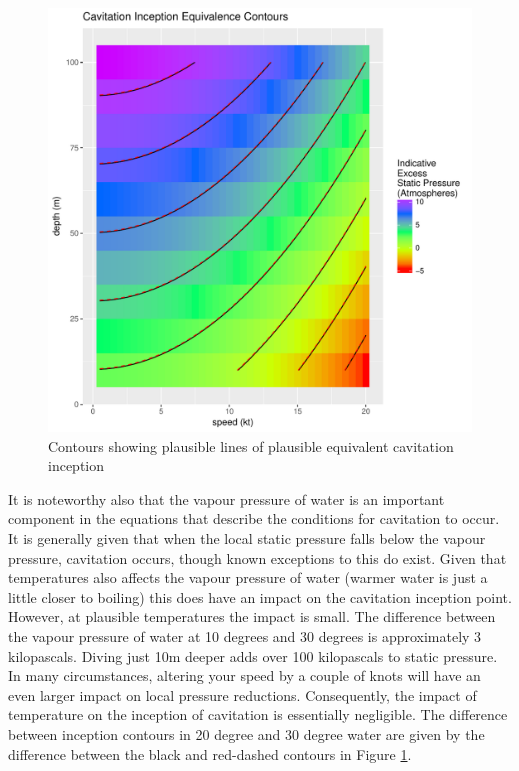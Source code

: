 \documentclass{article}\usepackage[]{graphicx}\usepackage[]{color}
\makeatletter
\def\maxwidth{ %
  \ifdim\Gin@nat@width>\linewidth
    \linewidth
  \else
    \Gin@nat@width
  \fi
}
\newenvironment{knitrout}{}{} %
\makeatother
\begin{document}
\begin{figure}
\begin{knitrout}
\color{fgcolor}

{\centering \includegraphics[width=\maxwidth]{figures/plots-plot_inception-1} 

}



\end{knitrout}
\caption{Contours showing plausible lines of plausible equivalent cavitation inception}
\label{fig:InceptionContours}
\end{figure}

It is noteworthy also that the vapour pressure of water is an important component in the equations that describe the conditions for cavitation to occur.  It is generally given that when the local static pressure falls below the vapour pressure, cavitation occurs, though known exceptions to this do exist.  Given that temperatures also affects the vapour pressure of water (warmer water is just a little closer to boiling) this does have an impact on the cavitation inception point.  However, at plausible temperatures the impact is small.  The difference between the vapour pressure of water at 10 degrees and 30 degrees is approximately 3 kilopascals.  Diving just 10m deeper adds over 100 kilopascals to static pressure.  In many circumstances, altering your speed by a couple of knots will have an even larger impact on local pressure reductions.  Consequently, the impact of temperature on the inception of cavitation is essentially negligible.  The difference between inception contours in 20 degree and 30 degree water are given by the difference between the black and red-dashed contours in Figure \ref{fig:InceptionContours}.
\end{document}
